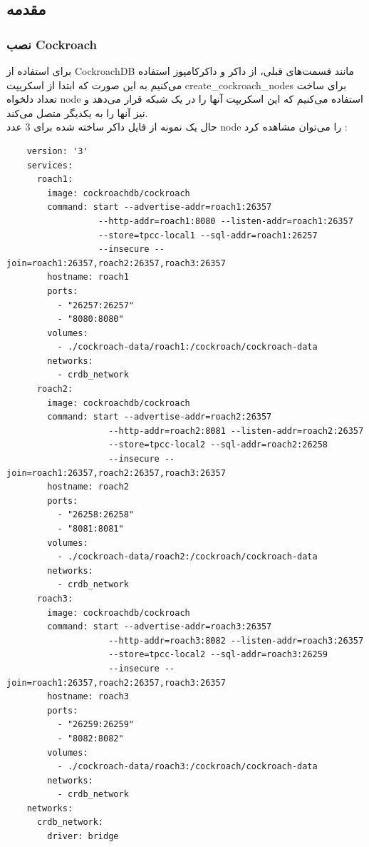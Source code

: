 \subsection{مقدمه}
\subsubsection{نصب Cockroach}
برای استفاده از CockroachDB 
مانند قسمت‌های قبلی، از داکر و داکرکامپوز
استفاده می‌کنیم به این صورت که ابتدا از اسکریپت
create\_cockroach\_nodes
برای ساخت تعداد دلخواه node 
استفاده می‌کنیم که این اسکریپت آنها را در یک شبکه قرار می‌دهد و نیز آنها را به یکدیگر متصل می‌کند.
\\
حال یک نمونه از فایل داکر ساخته شده برای 3 عدد node را می‌توان مشاهده کرد :
\begin{latin}
  \begin{verbatim}
    version: '3'
    services:
      roach1:
        image: cockroachdb/cockroach
        command: start --advertise-addr=roach1:26357 
                  --http-addr=roach1:8080 --listen-addr=roach1:26357 
                  --store=tpcc-local1 --sql-addr=roach1:26257 
                  --insecure --join=roach1:26357,roach2:26357,roach3:26357
        hostname: roach1
        ports:
          - "26257:26257"
          - "8080:8080"
        volumes:
          - ./cockroach-data/roach1:/cockroach/cockroach-data
        networks:
          - crdb_network
      roach2:
        image: cockroachdb/cockroach
        command: start --advertise-addr=roach2:26357
                    --http-addr=roach2:8081 --listen-addr=roach2:26357
                    --store=tpcc-local2 --sql-addr=roach2:26258
                    --insecure --join=roach1:26357,roach2:26357,roach3:26357
        hostname: roach2
        ports:
          - "26258:26258"
          - "8081:8081"
        volumes:
          - ./cockroach-data/roach2:/cockroach/cockroach-data
        networks:
          - crdb_network
      roach3:
        image: cockroachdb/cockroach
        command: start --advertise-addr=roach3:26357
                    --http-addr=roach3:8082 --listen-addr=roach3:26357
                    --store=tpcc-local2 --sql-addr=roach3:26259
                    --insecure --join=roach1:26357,roach2:26357,roach3:26357
        hostname: roach3
        ports:
          - "26259:26259"
          - "8082:8082"
        volumes:
          - ./cockroach-data/roach3:/cockroach/cockroach-data
        networks:
          - crdb_network
    networks:
      crdb_network:
        driver: bridge

  \end{verbatim}
\end{latin}

